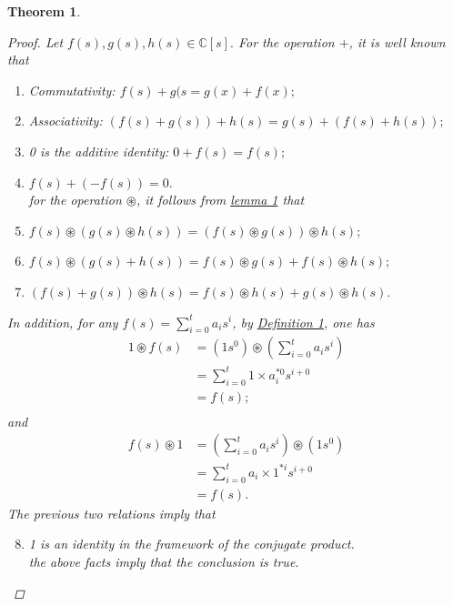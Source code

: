 \documentclass[12pt,a4paper,fleqn,twoside]{article}
\theoremstyle{plain}
\newtheorem{theorem}{Theorem}
\begin{document}
\begin{theorem}
\begin{proof}
		 \textnormal{Let $f(s),g(s),h(s)\in \mathbb{C}[s].$ For the operation $+$, it is well known that}
			\begin{enumerate}[(1)]
				\item Commutativity: $f(s)+g(s=g(x)+f(x);$
				\item Associativity: $(f(s)+g(s))+h(s)=g(s)+(f(s)+h(s));$
				\item 0 is the additive identity: $0+f(s)=f(s);$
				\item $f(s)+(-f(s))=0.$\\
				\textnormal{for the operation $\circledast$, it follows from \hyperref[lemma 1]{lemma 1} that} 
				\item $f(s)\circledast(g(s)\circledast h(s))=(f(s)\circledast g(s))\circledast h(s);$
				\item $f(s)\circledast(g(s) + h(s))=f(s)\circledast g(s) + f(s)\circledast h(s);$
				\item $(f(s)+g(s))\circledast h(s)= f(s)\circledast h(s)+g(s)\circledast h(s).$
			\end{enumerate}
				In addition, for any $f(s)=\sum_{i=0}^{t} a_i s^i$, by \hyperref[Definition 1]{Definition 1}, one has 
			\begin{align*}
				1\circledast f(s) &=\left(1s^0\right)\circledast \left(\displaystyle\sum_{i=0}^{t} a_i s^i\right) \\
				&=\sum_{i=0}^{t}1 \times a_{i}^{*0}s^{i+0}\\ 
				&=f(s);\\
			\end{align*}
			and
			\begin{align*}
				f(s)\circledast 1&= \left(\displaystyle\sum_{i=0}^{t}a_i s^i\right)\circledast (1s^0)\\
				&=\sum_{i=0}^{t}a_i \times 1^{*i}s^{i+0}\\
				&=f(s).
			\end{align*}
			The previous two relations imply that 
			\begin{enumerate}[(1)] 
				\setcounter{enumi}{7}
				\item 1 is an identity in the framework of the conjugate product.\\
				the above facts imply that the conclusion is true.\qedhere
			\end{enumerate}
		\end{proof}	
	\end{theorem}
\end{document}
